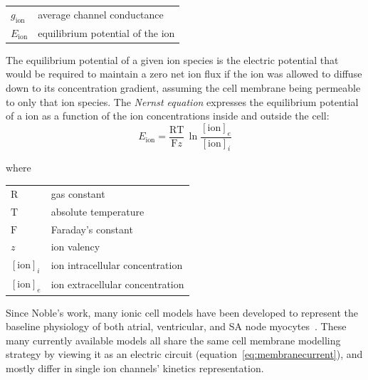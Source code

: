\vspace{0.2cm}
\begin{tabular}{ll}
    $g_{\textrm{ion}}$ & average channel conductance \\
    $E_\textrm{ion}$ & equilibrium potential of the ion
\end{tabular}

\vspace{0.2cm}\noindent
The equilibrium potential of a given ion species is the electric potential that would be required to maintain a zero net ion flux if the ion was allowed to diffuse down to its concentration gradient, assuming the cell membrane being permeable to only that ion species. The \textit{Nernst equation} expresses the equilibrium potential of a ion as a function of the ion concentrations inside and outside the cell:
%
\begin{equation}
    E_{\textrm{ion}}=\frac{\textrm{R}\textrm{T}}{\textrm{F}z}\,\ln{\frac{[\textrm{ion}]_{e}}{[\textrm{ion}]_{i}}}
\end{equation}

\noindent
where

\vspace{0.2cm}
\begin{tabular}{ll}
    $\textrm{R}$  & gas constant \\
    $\textrm{T}$  & absolute temperature \\
    $\textrm{F}$  & Faraday's constant \\
    $z$           & ion valency \\
    $[\textrm{ion}]_{i}$  & ion intracellular concentration \\
    $[\textrm{ion}]_{e}$  & ion extracellular concentration \\
\end{tabular}

\vspace{0.2cm}
Since Noble's work, many ionic cell models have been developed to represent the baseline physiology of both atrial, ventricular, and SA node myocytes~\cite{Corrado:2020}. These many currently available models all share the same cell membrane modelling strategy by viewing it as an electric circuit (equation~\eqref{eq:membranecurrent}), and mostly differ in single ion channels' kinetics representation.

